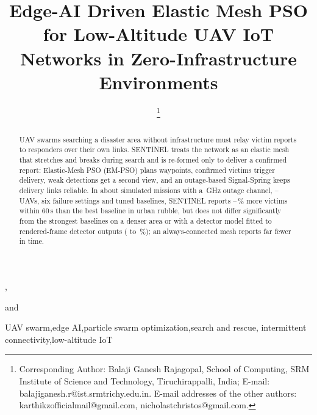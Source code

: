 \documentclass{IOS-Book-Article}
\newif\ifhighlight
\newenvironment{revised}{\ifhighlight\color{blue}\fi}{}
\newcommand{\rev}[1]{\ifhighlight{\color{blue}#1}\else#1\fi}
\newcommand{\kept}[1]{{\color{black}#1}}
\begin{document}
\begin{frontmatter}
\title{Edge-AI Driven Elastic Mesh PSO for Low-Altitude UAV IoT Networks in Zero-Infrastructure Environments}

\author[A]{ },
\author[A]{ }
and
\author[B]{ %
\thanks{Corresponding Author: Balaji Ganesh Rajagopal, \rev{School of Computing, SRM Institute of
Science and Technology, Tiruchirappalli, India}; E-mail: balajiganesh.r@ist.srmtrichy.edu.in. E-mail addresses of the other authors:
karthikzofficialmail@gmail.com, nicholastchristos@gmail.com.}}
\address[A]{\rev{Department of Computer Science and Engineering (AI \& ML), SRM Institute of Science
and Technology, Tiruchirappalli, India}}
\address[B]{\rev{School of Computing, SRM Institute of Science and Technology, Tiruchirappalli, India}}

\begin{abstract}
\begin{revised}
UAV swarms searching a disaster area without infrastructure must relay victim reports to
responders over their own links. SENTINEL treats the network as an elastic mesh that
stretches and breaks during search and is re-formed only to deliver a confirmed report: Elastic-Mesh
PSO (EM-PSO) plans waypoints, confirmed victims trigger delivery, weak detections get a
second view, and an outage-based Signal-Spring keeps delivery links reliable. In about
\nMissions{} simulated missions with a \nFreq\,GHz outage channel, \nEoneNmin--\nEoneNmax{} UAVs, six
failure settings and \nBaseWord{} tuned baselines, SENTINEL reports \nEthreeGainLo--\nEthreeGainHi\,\% more
victims within 60\,s than the best baseline in urban rubble, but does not differ significantly from the
strongest baselines on a denser area or with a detector model fitted to rendered-frame detector outputs
(\nRobDiffLo{} to \nRobDiffHi\,\%); an always-connected mesh reports far fewer in time.
\end{revised}
\end{abstract}

\begin{keyword}
\rev{UAV swarm}\sep \kept{edge AI}\sep \rev{particle swarm optimization}\sep \kept{search and rescue}\sep
\rev{intermittent connectivity}\sep \kept{low-altitude IoT}
\end{keyword}
\end{frontmatter}
\thispagestyle{empty}
\pagestyle{empty}
\end{document}
